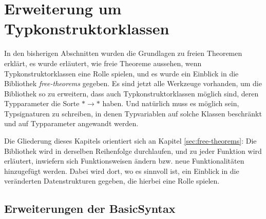 \section{Erweiterung um Typkonstruktorklassen}

\label{sec:erweiterung-um-typklassen}

In den bisherigen Abschnitten wurden die Grundlagen zu freien Theoremen erklärt, es wurde erläutert, wie freie Theoreme
aussehen, wenn Typkonstruktorklassen eine Rolle spielen, und es wurde ein Einblick in die Bibliothek \textit{free-theorems}
gegeben. Es sind jetzt alle Werkzeuge vorhanden, um die Bibliothek so zu erweitern, dass auch Typkonstruktorklassen möglich
sind, deren Typparameter die Sorte $* \rightarrow *$ haben. Und natürlich muss es möglich sein, Typsignaturen zu schreiben,
in denen Typvariablen auf solche Klassen beschränkt und auf Typparameter angewandt werden.

Die Gliederung dieses Kapitels orientiert sich an Kapitel \ref{sec:free-theorems}: Die Bibliothek wird in derselben Reihenfolge
durchlaufen, und zu jeder Funktion wird erläutert, inwiefern sich Funktionsweisen ändern bzw. neue Funktionalitäten hinzugefügt
werden. Dabei wird dort, wo es sinnvoll ist, ein Einblick in die veränderten Datenstrukturen gegeben, die hierbei eine Rolle spielen.


\subsection{Erweiterungen der BasicSyntax}

